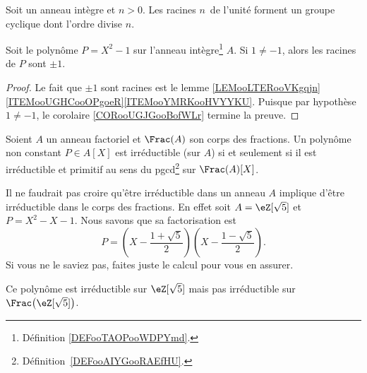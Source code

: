\begin{proposition}
	Soit un anneau intègre et \( n>0\). Les racines \( n\)\ieme\ de l'unité forment un groupe cyclique dont l'ordre divise \( n\).
\end{proposition}

\begin{lemma}       \label{LEMooHDJIooPTpUCJ}
	Soit le polynôme \( P=X^2-1\) sur l'anneau intègre\footnote{Définition \ref{DEFooTAOPooWDPYmd}.} \( A\). Si \( 1\neq -1\), alors les racines de \( P\) sont \( \pm 1\).
\end{lemma}

\begin{proof}
	Le fait que \( \pm 1\) sont racines est le lemme \ref{LEMooLTERooVKgqjn}\ref{ITEMooUGHCooOPgoeR}\ref{ITEMooYMRKooHVYYKU}. Puisque par hypothèse \( 1\neq -1\), le corolaire \ref{CORooUGJGooBofWLr} termine la preuve.
\end{proof}

\begin{corollary}       \label{CORooZCSOooHQVAOV}
	Soient \( A\) un anneau factoriel et \( \Frac(A)\) son corps des fractions. Un polynôme non constant \( P\in A[X]\) est irréductible (sur \( A\)) si et seulement si il est irréductible et primitif au sens du pgcd\footnote{Définition~\ref{DEFooAIYGooRAEfHU}.} sur \( \Frac(A)[X]\).
\end{corollary}

\begin{example}
	Il ne faudrait pas croire qu'être irréductible dans un anneau \( A\) implique d'être irréductible dans le corps des fractions. En effet soit \( A=\eZ[\sqrt{ 5 }]\) et \( P=X^2-X-1\). Nous savons que sa factorisation est
	\begin{equation}
		P=\left( X-\frac{ 1+\sqrt{ 5 } }{ 2 } \right)\left( X-\frac{ 1-\sqrt{ 5 } }{ 2 } \right).
	\end{equation}
	Si vous ne le saviez pas, faites juste le calcul pour vous en assurer.

	Ce polynôme est irréductible sur \( \eZ[\sqrt{ 5 }]\) mais pas irréductible sur \( \Frac\big( \eZ[\sqrt{ 5 }] \big)\).
\end{example}

